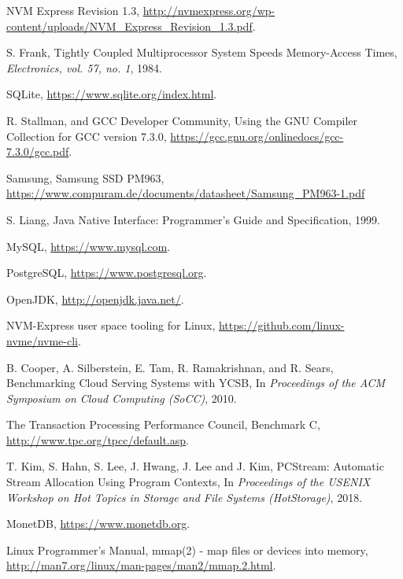 \begin{thebibliography}{00}
NVM Express Revision 1.3,
\url{http://nvmexpress.org/wp-content/uploads/NVM_Express_Revision_1.3.pdf}.

S. Frank,
Tightly Coupled Multiprocessor System Speeds Memory-Access Times,
\textit{Electronics, vol. 57, no. 1}, 1984.

SQLite,
\url{https://www.sqlite.org/index.html}.


R. Stallman, and GCC Developer Community,
Using the GNU Compiler Collection for GCC version 7.3.0,
\url{https://gcc.gnu.org/onlinedocs/gcc-7.3.0/gcc.pdf}.

Samsung, Samsung SSD PM963, 
\url{https://www.compuram.de/documents/datasheet/Samsung_PM963-1.pdf}

S. Liang,
Java Native Interface: Programmer's Guide and Specification,
1999.

MySQL,
\url{https://www.mysql.com}.

PostgreSQL,
\url{https://www.postgresql.org}.

OpenJDK,
\url{http://openjdk.java.net/}.

NVM-Express user space tooling for Linux,
\url{https://github.com/linux-nvme/nvme-cli}.

B. Cooper, A. Silberstein, E. Tam, R. Ramakrishnan, and R. Sears,
Benchmarking Cloud Serving Systems with YCSB,
In \textit{Proceedings of the ACM Symposium on Cloud Computing (SoCC)}, 2010.

The Transaction Processing Performance Council,
Benchmark C,
\url{http://www.tpc.org/tpcc/default.asp}. 

T. Kim, S. Hahn, S. Lee, J. Hwang, J. Lee and J. Kim,
PCStream: Automatic Stream Allocation Using Program Contexts,
In \textit{Proceedings of the USENIX Workshop on Hot Topics in Storage
and File Systems (HotStorage)}, 2018.

MonetDB,
\url{https://www.monetdb.org}.

Linux Programmer's Manual,
mmap(2) - map files or devices into memory,
\url{http://man7.org/linux/man-pages/man2/mmap.2.html}.

\end{thebibliography}
